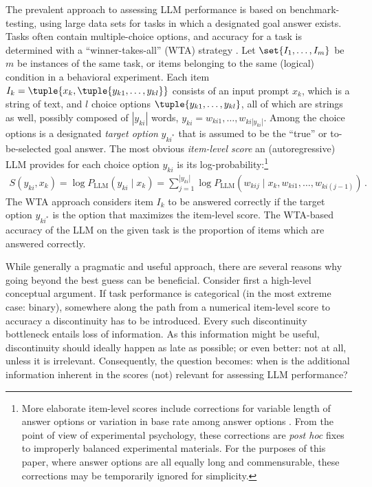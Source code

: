 \documentclass[fleqn]{article}
\begin{document}
The prevalent approach to assessing LLM performance is based on benchmark-testing, using large data sets for tasks in which a designated goal answer exists.
Tasks often contain multiple-choice options, and accuracy for a task is determined with a ``winner-takes-all'' (WTA) strategy \citep[e.g.,][]{srivastava2023-BIGbench}.
Let $\set{I_{1}, \dots, I_{m}}$ be $m$ be instances of the same task, or items belonging to the same (logical) condition in a behavioral experiment.
Each item $I_{k} = \tuple{x_{k}, \tuple{y_{k1}, \dots, y_{kl}}}$ consists of an input prompt $x_{k}$, which is a string of text, and $l$ choice options $\tuple{y_{k1}, \dots, y_{kl}}$, all of which are strings as well, possibly composed of $|y_{ki}|$ words, $y_{ki} = w_{ki1}, \dots, w_{ki|y_{ki}|}$.
Among the choice options is a designated \emph{target option} $y_{ki^{*}}$ that is assumed to be the ``true'' or to-be-selected goal answer.
The most obvious \emph{item-level score} an (autoregressive) LLM provides for each choice option $y_{ki}$ is its log-probability:\footnote{
  More elaborate item-level scores include corrections for variable length of answer options \citep[e.g.,][]{BrownMann2020:Language-Models} or variation in base rate among answer options \citep[e.g.,][]{HoltzmanWest2021:Surface-Form-Co}.
  From the point of view of experimental psychology, these corrections are \emph{post hoc} fixes to improperly balanced experimental materials.
  For the purposes of this paper, where answer options are all equally long and commensurable, these corrections may be temporarily ignored for simplicity.
}
%
\begin{align*}
  S\left( y_{ki}, x_{k} \right) = \log P_{\text{LLM}} \left(y_{ki} \mid x_{k} \right) =  \sum_{j=1}^{|y_{ki}|} \log P_{\text{LLM}} \left(w_{kij} \mid x_{k}, w_{ki1}, \dots, w_{ki(j-1)} \right)  \,.
\end{align*}
%
The WTA approach considers item $I_{k}$ to be answered correctly if the target option $y_{ki^{*}}$ is the option that maximizes the item-level score.
The WTA-based accuracy of the LLM on the given task is the proportion of items which are answered correctly.

While generally a pragmatic and useful approach, there are several reasons why going beyond the best guess can be beneficial.
Consider first a high-level conceptual argument.
If task performance is categorical (in the most extreme case: binary), somewhere along the path from a numerical item-level score to accuracy a discontinuity has to be introduced.
Every such discontinuity bottleneck entails loss of information.
As this information might be useful, discontinuity should ideally happen as late as possible; or even better: not at all, unless it is irrelevant.
Consequently, the question becomes: when is the additional information inherent in the scores (not) relevant for assessing LLM performance?
\end{document}
